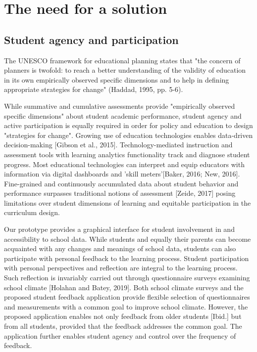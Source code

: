 \documentclass{article}
\begin{document}
\section{The need for a solution}

\subsection{Student agency and participation}
The UNESCO framework for educational planning states that "the concern of planners is twofold: to reach a better understanding of the validity of education in its own empirically observed specific dimensions and to help in defining appropriate strategies for change" (Haddad, 1995, pp. 5-6).

While summative and cumulative assessments provide "empirically observed specific dimensions" about student academic performance, student agency and active participation is equally required in order for policy and education to design "strategies for change". Growing use of education technologies enables data-driven decision-making [Gibson et al., 2015]. Technology-mediated instruction and assessment tools with learning analytics functionality track and diagnose student progress. Most educational technologies can interpret and equip educators with information via digital dashboards and 'skill meters'[Baker, 2016; New, 2016]. Fine-grained and continuously accumulated data about student behavior and performance surpasses traditional notions of assessment [Zeide, 2017] posing limitations over student dimensions of learning and equitable participation in the curriculum design.

Our prototype provides a graphical interface for student involvement in and accessibility to school data. While students and equally their parents can become acquainted with any changes and meanings of school data, students can also participate with personal feedback to the learning process. Student participation with personal perspectives and reflection are integral to the learning process. Such reflection is invariably carried out through questionnaire surveys examining school climate [Holahan and Batey, 2019]. Both school climate surveys and the proposed student feedback application provide flexible selection of questionnaires and measurements with a common goal to improve school climate. However, the proposed application enables not only feedback from older students [Ibid.] but from all students, provided that the feedback addresses the common goal. The application further enables student agency and control over the frequency of feedback.
\end{document}
